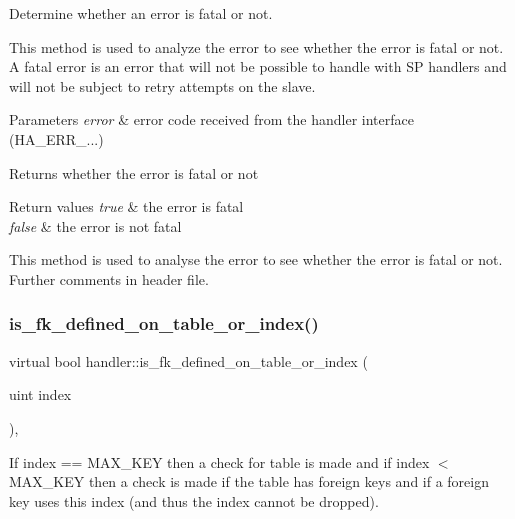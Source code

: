 Determine whether an error is fatal or not. 

This method is used to analyze the error to see whether the error is fatal or not. A fatal error is an error that will not be possible to handle with SP handlers and will not be subject to retry attempts on the slave.


\begin{DoxyParams}{Parameters}
{\em error} & error code received from the handler interface (H\+A\+\_\+\+E\+R\+R\+\_\+...)\\
\hline
\end{DoxyParams}
\begin{DoxyReturn}{Returns}
whether the error is fatal or not 
\end{DoxyReturn}

\begin{DoxyRetVals}{Return values}
{\em true} & the error is fatal \\
\hline
{\em false} & the error is not fatal\\
\hline
\end{DoxyRetVals}
This method is used to analyse the error to see whether the error is fatal or not. Further comments in header file. \mbox{\label{classhandler_adda33331aacc500b1b974033cb64a869}} 
\subsubsection{\texorpdfstring{is\+\_\+fk\+\_\+defined\+\_\+on\+\_\+table\+\_\+or\+\_\+index()}{is\_fk\_defined\_on\_table\_or\_index()}}
{\footnotesize\ttfamily virtual bool handler\+::is\+\_\+fk\+\_\+defined\+\_\+on\+\_\+table\+\_\+or\+\_\+index (\begin{DoxyParamCaption}\item[{uint}]{index }\end{DoxyParamCaption})\hspace{0.3cm}{\ttfamily [inline]}, {\ttfamily [virtual]}}

If index == M\+A\+X\+\_\+\+K\+EY then a check for table is made and if index $<$ M\+A\+X\+\_\+\+K\+EY then a check is made if the table has foreign keys and if a foreign key uses this index (and thus the index cannot be dropped).


